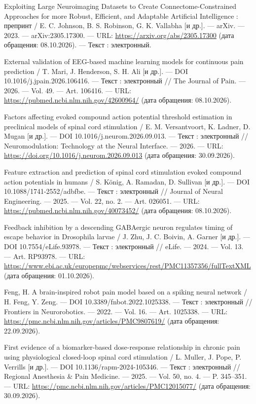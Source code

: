 \begin{list}{}{\setlength{\leftmargin}{10mm}\setlength{\labelwidth}{8mm}\setlength{\labelsep}{2mm}\setlength{\itemsep}{0pt}\setlength{\parsep}{0pt}\setlength{\topsep}{0pt}}
\item[123.] Exploiting Large Neuroimaging Datasets to Create Connectome-Constrained Approaches for more Robust, Efficient, and Adaptable Artificial Intelligence : препринт / E. C. Johnson, B. S. Robinson, G. K. Vallabha [и др.]. — arXiv. — 2023. — arXiv:2305.17300. — URL: \url{https://arxiv.org/abs/2305.17300} (дата обращения: 08.10.2026). — Текст : электронный.
\item[124.] External validation of EEG-based machine learning models for continuous pain prediction / T. Mari, J. Henderson, S. H. Ali [и др.]. — DOI 10.1016/j.jpain.2026.106416. — Текст : электронный // The Journal of Pain. — 2026. — Vol. 49. — Art. 106416. — URL: \url{https://pubmed.ncbi.nlm.nih.gov/42600964/} (дата обращения: 08.10.2026).
\item[125.] Factors affecting evoked compound action potential threshold estimation in preclinical models of spinal cord stimulation / E. M. Versantvoort, K. Ladner, D. Mugan [и др.]. — DOI 10.1016/j.neurom.2026.09.013. — Текст : электронный // Neuromodulation: Technology at the Neural Interface. — 2026. — URL: \url{https://doi.org/10.1016/j.neurom.2026.09.013} (дата обращения: 30.09.2026).
\item[126.] Feature extraction and prediction of spinal cord stimulation evoked compound action potentials in humans / S. König, A. Ramadan, D. Sullivan [и др.]. — DOI 10.1088/1741-2552/adbfbe. — Текст : электронный // Journal of Neural Engineering. — 2025. — Vol. 22, no. 2. — Art. 026051. — URL: \url{https://pubmed.ncbi.nlm.nih.gov/40073452/} (дата обращения: 08.10.2026).
\item[127.] Feedback inhibition by a descending GABAergic neuron regulates timing of escape behavior in Drosophila larvae / J. Zhu, J. C. Boivin, A. Garner [и др.]. — DOI 10.7554/eLife.93978. — Текст : электронный // eLife. — 2024. — Vol. 13. — Art. RP93978. — URL: \url{https://www.ebi.ac.uk/europepmc/webservices/rest/PMC11357356/fullTextXML} (дата обращения: 01.10.2026).
\item[128.] Feng, H. A brain-inspired robot pain model based on a spiking neural network / H. Feng, Y. Zeng. — DOI 10.3389/fnbot.2022.1025338. — Текст : электронный // Frontiers in Neurorobotics. — 2022. — Vol. 16. — Art. 1025338. — URL: \url{https://pmc.ncbi.nlm.nih.gov/articles/PMC9807619/} (дата обращения: 22.09.2026).
\item[129.] First evidence of a biomarker-based dose-response relationship in chronic pain using physiological closed-loop spinal cord stimulation / L. Muller, J. Pope, P. Verrills [и др.]. — DOI 10.1136/rapm-2024-105346. — Текст : электронный // Regional Anesthesia \& Pain Medicine. — 2025. — Vol. 50, no. 4. — P. 345–351. — URL: \url{https://pmc.ncbi.nlm.nih.gov/articles/PMC12015077/} (дата обращения: 30.09.2026).

\end{list}
